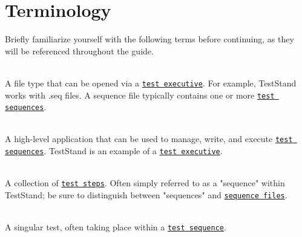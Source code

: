 \chapter{Terminology }
\hypertarget{terms}{}\label{terms}
Briefly familiarize yourself with the following terms before continuing, as they will be referenced throughout the guide.


\begin{DoxyDescription}
\item[{\parbox[t]{\linewidth}{{\bfseries{\label{terms_term_sequence_file}%
\Hypertarget{terms_term_sequence_file}%
Sequence File}} }}]\hfill \\
A file type that can be opened via a \href{\#term_test_executive}{\texttt{test executive}}. For example, Test\+Stand works with .seq files. A sequence file typically contains one or more \href{\#term_sequence}{\texttt{test sequences}}. 


\item[{\parbox[t]{\linewidth}{{\bfseries{\label{terms_term_test_executive}%
\Hypertarget{terms_term_test_executive}%
Test Executive}} }}]\hfill \\
A high-\/level application that can be used to manage, write, and execute \href{\#term_sequence}{\texttt{test sequences}}. Test\+Stand is an example of a \href{\#term_test_executive}{\texttt{test executive}}. 


\item[{\parbox[t]{\linewidth}{{\bfseries{\label{terms_term_sequence}%
\Hypertarget{terms_term_sequence}%
Test Sequence}} }}]\hfill \\
A collection of \href{\#term_test_step}{\texttt{test steps}}. Often simply referred to as a "{}sequence"{} within Test\+Stand; be sure to distinguish between "{}sequences"{} and \href{\#term_sequence_file}{\texttt{sequence files}}. 


\item[{\parbox[t]{\linewidth}{{\bfseries{\label{terms_term_test_step}%
\Hypertarget{terms_term_test_step}%
Test Step}} }}]\hfill \\
A singular test, often taking place within a \href{\#term_sequence}{\texttt{test sequence}}.  
\end{DoxyDescription}